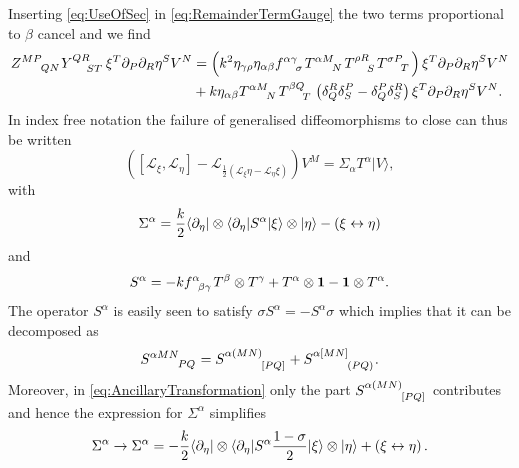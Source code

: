 Inserting \eqref{eq:UseOfSec} in \eqref{eq:RemainderTermGauge} the two terms proportional to $\beta$ cancel and we find 
\begin{equation}
    \begin{aligned}
        \tensor{Z}{^{MP}_{QN}}\tensor{Y}{^{QR}_{ST}}\xi^T\pd_P\pd_R\eta^SV^N &= \left(k^2\eta_{\gamma\rho}\eta_{\alpha\beta}\tensor{f}{^{\alpha\gamma}_\sigma}\tensor{T}{^{\alpha M}_N}\tensor{T}{^{\rho R}_S}\tensor{T}{^{\sigma P}_T}\right)\xi^T\pd_P\pd_R\eta^SV^N\\
        &+k\eta_{\alpha\beta}\tensor{T}{^{\alpha M}_N}\tensor{T}{^{\beta Q}_T}\left(\delta^R_Q\delta^P_S-\delta_Q^P\delta_S^R\right) \xi^T\pd_P\pd_R\eta^SV^N.
    \end{aligned}
\end{equation}
In index free notation the failure of generalised diffeomorphisms to close can thus be written
\begin{equation}\label{eq:AncillaryTransformation}
    \left(\left[\mathscr{L}_\xi,\mathscr{L}_\eta\right]-\mathscr{L}_{\frac{1}{2}\left(\mathscr{L}_\xi\eta-\mathscr{L}_\eta\xi\right)}\right)V^M = \Sigma_\alpha T^\alpha |V\rangle,
\end{equation}
with 
\begin{equation}
    \Sigma^\alpha = \frac{k}{2}\langle \partial_\eta|\otimes\langle \partial_\eta| S^\alpha|\xi\rangle \otimes |\eta\rangle - \left(\xi\leftrightarrow\eta\right)
\end{equation}
and 
\begin{equation}\label{eq:STensor}
    S^\alpha = -k\tensor{f}{^{\alpha}_{\beta\gamma}}T^\beta\otimes T^\gamma +T^\alpha\otimes \mathbf{1}-\mathbf{1}\otimes T^\alpha. 
\end{equation}
The operator $S^\alpha$ is easily seen to satisfy $\sigma S^\alpha = -S^\alpha\sigma$ which implies that it can be decomposed as 
\begin{equation}
    \tensor{S}{^{\alpha MN}_{PQ}} = \tensor{S}{^{\alpha (MN)}_{[PQ]}}+\tensor{S}{^{\alpha [MN]}_{(PQ)}}. 
\end{equation}
Moreover, in \eqref{eq:AncillaryTransformation} only the part $\tensor{S}{^{\alpha (MN)}_{[PQ]}}$ contributes and hence the expression for $\Sigma^\alpha$ simplifies
\begin{equation}\label{eq:Temp}
    \Sigma^\alpha\to \Sigma^\alpha = -\frac{k}{2}\langle \partial_\eta|\otimes\langle \partial_\eta| S^\alpha\frac{1-\sigma}{2}|\xi\rangle \otimes |\eta\rangle + \left(\xi\leftrightarrow\eta\right).
\end{equation}

